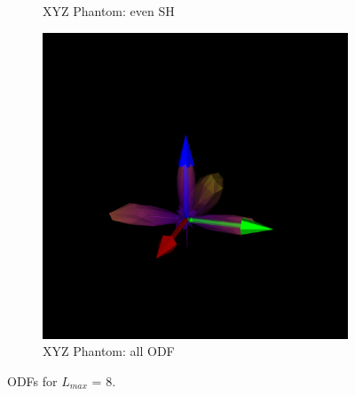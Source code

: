 \documentclass[11pt]{article}
\begin{document}
\begin{figure}[h]
\begin{subfigure}[b]{0.3\textwidth}
    \caption{XYZ Phantom: even SH }
    \label{fig:xyz_even}
  \end{subfigure}
  \hspace{1em}
  \begin{subfigure}[b]{0.3\textwidth}
    \includegraphics[width=\linewidth]{figs/phant_all}
    \caption{XYZ Phantom: all ODF}
    \label{fig:xyz_all}
  \end{subfigure}
  \caption{ODFs for $L_{max}$ = 8.}
  \label{fig:odfs}
\end{figure}



\end{document}
